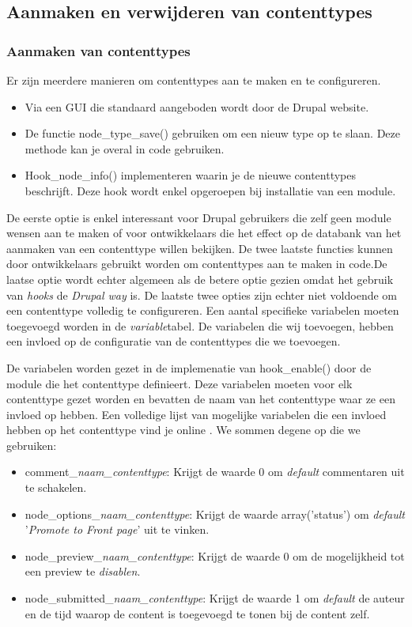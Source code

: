 \subsection{Aanmaken en verwijderen van contenttypes}\label{contenttypeManipulatie}
\subsubsection{Aanmaken van contenttypes}
Er zijn meerdere manieren om contenttypes aan te maken en te configureren.
\begin{itemize}
\item Via een GUI die standaard aangeboden wordt door de Drupal website.
\item De functie node\_type\_save() gebruiken om een nieuw type op te slaan. Deze methode kan je overal in code gebruiken.
\item Hook\_node\_info() implementeren waarin je de nieuwe contenttypes beschrijft. Deze hook wordt enkel opgeroepen bij installatie van een module.
\end{itemize}
\noindent
De eerste optie is enkel interessant voor Drupal gebruikers die zelf geen module wensen aan te maken of voor ontwikkelaars die het effect op de databank van het aanmaken van een contenttype willen bekijken. De twee laatste functies kunnen door ontwikkelaars gebruikt worden om contenttypes aan te maken in code.De laatse optie wordt echter algemeen als de betere optie gezien omdat het gebruik van \textit{hooks} de \textit{Drupal way} is.
De laatste twee opties zijn echter niet voldoende om een contenttype volledig te configureren. Een aantal specifieke variabelen moeten toegevoegd worden in de \textit{variable}tabel. De variabelen die wij toevoegen, hebben een invloed op de configuratie van de contenttypes die we toevoegen.

De variabelen worden gezet in de implemenatie van hook\_enable() door de module die het contenttype definieert. Deze variabelen moeten voor elk contenttype gezet worden en bevatten de naam van het contenttype waar ze een invloed op hebben. Een volledige lijst van mogelijke variabelen die een invloed hebben op het contenttype vind je online \cite{contentTypeVariables}. We sommen degene op die we gebruiken:
\begin{itemize}
\item comment\_\textit{naam\_contenttype}: Krijgt de waarde 0 om \textit{default} commentaren uit te schakelen.
\item node\_options\_\textit{naam\_contenttype}: Krijgt de waarde array('status') om \textit{default} '\textit{Promote to Front page}' uit te vinken.
\item node\_preview\_\textit{naam\_contenttype}: Krijgt de waarde 0 om de mogelijkheid tot een preview te \textit{disablen}.
\item node\_submitted\_\textit{naam\_contenttype}: Krijgt de waarde 1 om \textit{default} de auteur en de tijd waarop de content is toegevoegd te tonen bij de content zelf.
\end{itemize}

